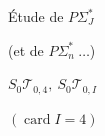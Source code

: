 Étude de $P\Sigma_J^*$

(et de $P\Sigma_n^*\ \ldots$)

$S_0\mathcal T_{0,4},\ S_0\mathcal T_{0,I}$

$(\operatorname{card}I=4)$
